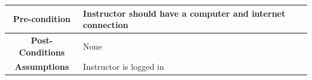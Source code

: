 \documentclass{scrreprt}
\begin{document}
\begin{table}[H]
\begin{tabular}{|c|l|}
\textbf{Pre-condition}        & Instructor should have a computer and internet connection                                                                                                                                                                                                                                                                         \\ \hline
\textbf{Post-Conditions}      & None                                                                                                                                                                                                                                                                                                                              \\ \hline
\textbf{Assumptions}          & Instructor is logged in                                                                                                                                                                                                                                                                                                           \\ \hline
\end{tabular}
\end{table}
\end{document}
